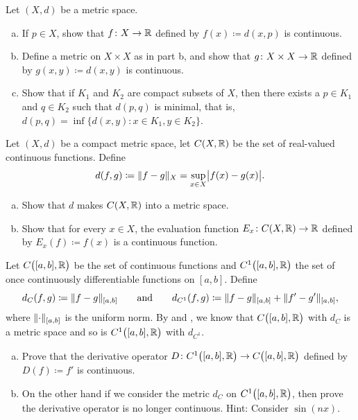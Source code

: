 \begin{samepage}
\begin{exercise}
Let $(X,d)$ be a metric space.
\begin{enumerate}[a)]
\item
If $p \in X$,
show that $f \colon X \to {\mathbb{R}}$ defined
by $f(x) \coloneqq d(x,p)$ is continuous.
\item
Define a metric on $X \times X$ as in  part
b, and show that $g \colon X \times X \to {\mathbb{R}}$ defined by
$g(x,y) \coloneqq d(x,y)$ is continuous.
\item
Show that if $K_1$ and $K_2$ are compact subsets of $X$, then
there exists a $p \in K_1$ and $q \in K_2$ such that $d(p,q)$ is minimal,
that is, $d(p,q) = \inf \{ d(x,y) \colon x \in K_1, y \in K_2 \}$.
\end{enumerate}
\end{exercise}
\end{samepage}

\begin{exercise}
Let $(X,d)$ be a compact metric space, let $C(X,{\mathbb{R}})$ be the set
of real-valued continuous functions.  Define
\begin{equation*}
d(f,g) \coloneqq \lVert {f-g} \rVert_X = \sup_{x \in X} \bigl\lvert {f(x)-g(x)} \bigr\rvert .
\end{equation*}
\begin{enumerate}[a)]
\item
Show that $d$ makes $C(X,{\mathbb{R}})$ into a metric space.
\item
Show that for every $x \in X$, the evaluation function
$E_x \colon C(X,{\mathbb{R}}) \to {\mathbb{R}}$ defined by $E_x(f) \coloneqq f(x)$
is a continuous function.
\end{enumerate}
\end{exercise}

\begin{samepage}
\begin{exercise}
Let $C\bigl([a,b],{\mathbb{R}}\bigr)$ be the set of continuous functions and
$C^1\bigl([a,b],{\mathbb{R}}\bigr)$ the set of
once continuously differentiable functions on $[a,b]$.
Define
\begin{equation*}
d_{C}(f,g) \coloneqq \lVert {f-g} \rVert_{[a,b]}
\qquad \text{and} \qquad
d_{C^1}(f,g) \coloneqq \lVert {f-g} \rVert_{[a,b]} + \lVert {f'-g'} \rVert_{[a,b]},
\end{equation*}
where $\lVert {\cdot} \rVert_{[a,b]}$ is the uniform norm.
By  and , we know that
$C\bigl([a,b],{\mathbb{R}}\bigr)$ with $d_C$ is a metric space and
so is
$C^1\bigl([a,b],{\mathbb{R}}\bigr)$ with $d_{C^1}$.
\begin{enumerate}[a)]
\item
Prove that the derivative operator $D \colon 
C^1\bigl([a,b],{\mathbb{R}}\bigr) \to C\bigl([a,b],{\mathbb{R}}\bigr)$ defined by
$D(f) \coloneqq f'$ is continuous.
\item
On the other hand if we consider the metric $d_C$ on $C^1\bigl([a,b],{\mathbb{R}}\bigr)$,
then prove the derivative operator is no longer continuous.  Hint: Consider
$\sin(n x)$.
\end{enumerate}
\end{exercise}
\end{samepage}

